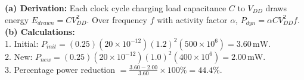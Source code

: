 \begin{solbox}
\textbf{(a) Derivation:} Each clock cycle charging load capacitance $C$ to $V_{DD}$ draws energy $E_{drawn} = C V_{DD}^2$. Over frequency $f$ with activity factor $\alpha$, $P_{dyn} = \alpha C V_{DD}^2 f$.\\
\textbf{(b) Calculations:}\\
1. Initial: $P_{init} = (0.25)(20 \times 10^{-12})(1.2)^2(500 \times 10^6) = 3.60\,\text{mW}$.\\
2. New: $P_{new} = (0.25)(20 \times 10^{-12})(1.0)^2(400 \times 10^6) = 2.00\,\text{mW}$.\\
3. Percentage power reduction $= \frac{3.60 - 2.00}{3.60} \times 100\% = 44.4\%$.
\end{solbox}
